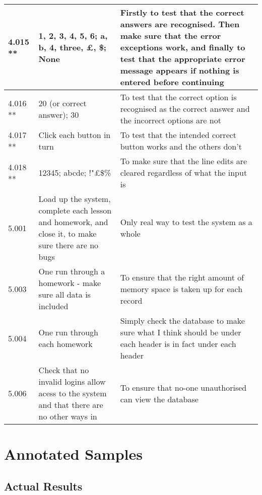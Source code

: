 \begin{landscape}
\begin{center}
\begin{longtable}{|p{4cm}|p{4cm}|p{5cm}|}
4.015 ** & 1, 2, 3, 4, 5, 6; a, b, 4, three, £, \$; None & Firstly to test that the correct answers are recognised. Then make sure that the error exceptions work, and finally to test that the appropriate error message appears if nothing is entered before continuing \\ \hline
4.016 ** & 20 (or correct answer); 30 & To test that the correct option is recognised as the correct answer and the incorrect options are not \\ \hline
4.017 ** & Click each button in turn & To test that the intended correct button works and the others don't \\ \hline
4.018 ** & 12345; abcde; !"£\$\% & To make sure that the line edits are cleared regardless of what the input is \\ \hline
5.001 & Load up the system, complete each lesson and homework, and close it, to make sure there are no bugs & Only real way to test the system as a whole \\ \hline
5.003 & One run through a homework - make sure all data is included & To ensure that the right amount of memory space is taken up for each record \\ \hline
5.004 & One run through each homework & Simply check the database to make sure what I think should be under each header is in fact under each header \\ \hline
5.006 & Check that no invalid logins allow acess to the system and that there are no other ways in & To ensure that no-one unauthorised can view the database \\ \hline
\end{longtable}
\end{center}

\section{Annotated Samples}

\subsection{Actual Results}


\end{landscape}
